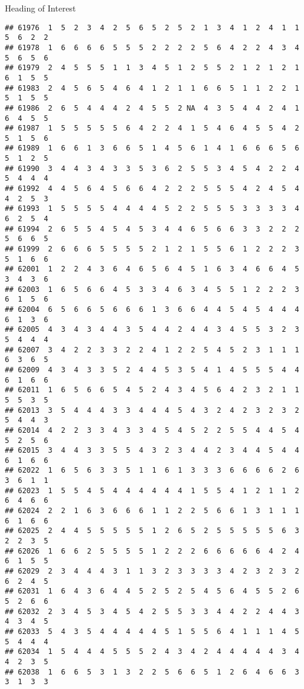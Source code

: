 \documentclass[
  ignorenonframetext,
]{beamer}
\begin{document}
\begin{frame}[fragile]{Heading of Interest}
\begin{verbatim}
## 61976  1  5  2  3  4  2  5  6  5  2  5  2  1  3  4  1  2  4  1  1  5  6  2  2
## 61978  1  6  6  6  6  5  5  5  2  2  2  2  5  6  4  2  2  4  3  4  5  6  5  6
## 61979  2  4  5  5  5  1  1  3  4  5  1  2  5  5  2  1  2  1  2  1  6  1  5  5
## 61983  2  4  5  6  5  4  6  4  1  2  1  1  6  6  5  1  1  2  2  1  5  1  5  5
## 61986  2  6  5  4  4  4  2  4  5  5  2 NA  4  3  5  4  4  2  4  1  6  4  5  5
## 61987  1  5  5  5  5  5  6  4  2  2  4  1  5  4  6  4  5  5  4  2  5  1  5  6
## 61989  1  6  6  1  3  6  6  5  1  4  5  6  1  4  1  6  6  6  5  6  5  1  2  5
## 61990  3  4  4  3  4  3  3  5  3  6  2  5  5  3  4  5  4  2  2  4  5  4  4  4
## 61992  4  4  5  6  4  5  6  6  4  2  2  2  5  5  5  4  2  4  5  4  4  2  5  3
## 61993  1  5  5  5  5  4  4  4  4  5  2  2  5  5  5  3  3  3  3  4  6  2  5  4
## 61994  2  6  5  5  4  5  4  5  3  4  4  6  5  6  6  3  3  2  2  2  5  6  6  5
## 61999  2  6  6  6  5  5  5  5  2  1  2  1  5  5  6  1  2  2  2  3  5  1  6  6
## 62001  1  2  2  4  3  6  4  6  5  6  4  5  1  6  3  4  6  6  4  5  3  4  3  6
## 62003  1  6  5  6  6  4  5  3  3  4  6  3  4  5  5  1  2  2  2  3  6  1  5  6
## 62004  6  5  6  6  5  6  6  6  1  3  6  6  4  4  5  4  5  4  4  4  6  1  3  6
## 62005  4  3  4  3  4  4  3  5  4  4  2  4  4  3  4  5  5  3  2  3  5  4  4  4
## 62007  3  4  2  2  3  3  2  2  4  1  2  2  5  4  5  2  3  1  1  1  6  3  6  5
## 62009  4  3  4  3  3  5  2  4  4  5  3  5  4  1  4  5  5  5  4  4  6  1  6  6
## 62011  1  6  5  6  6  5  4  5  2  4  3  4  5  6  4  2  3  2  1  1  5  5  3  5
## 62013  3  5  4  4  4  3  3  4  4  4  5  4  3  2  4  2  3  2  3  2  5  4  4  3
## 62014  4  2  2  3  3  4  3  3  4  5  4  5  2  2  5  5  4  4  5  4  5  2  5  6
## 62015  3  4  4  3  3  5  5  4  3  2  3  4  4  2  3  4  4  5  4  4  6  1  6  6
## 62022  1  6  5  6  3  3  5  1  1  6  1  3  3  3  6  6  6  6  2  6  3  6  1  1
## 62023  1  5  5  4  5  4  4  4  4  4  4  1  5  5  4  1  2  1  1  2  6  4  6  6
## 62024  2  2  1  6  3  6  6  6  1  1  2  2  5  6  6  1  3  1  1  1  6  1  6  6
## 62025  2  4  4  5  5  5  5  5  1  2  6  5  2  5  5  5  5  5  6  3  2  2  3  5
## 62026  1  6  6  2  5  5  5  5  1  2  2  2  6  6  6  6  6  4  2  4  6  1  5  5
## 62029  2  3  4  4  4  3  1  1  3  2  3  3  3  3  4  2  3  2  3  2  6  2  4  5
## 62031  1  6  4  3  6  4  4  5  2  5  2  5  4  5  6  4  5  5  2  6  5  2  6  6
## 62032  2  3  4  5  3  4  5  4  2  5  5  3  3  4  4  2  2  4  4  3  4  3  4  5
## 62033  5  4  3  5  4  4  4  4  4  5  1  5  5  6  4  1  1  1  4  5  5  4  4  4
## 62034  1  5  4  4  4  5  5  5  2  4  3  4  2  4  4  4  4  4  3  4  4  2  3  5
## 62038  1  6  6  5  3  1  3  2  2  5  6  6  5  1  2  6  4  6  6  3  3  1  3  3

\end{verbatim}
\end{frame}
\end{document}
